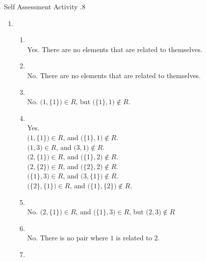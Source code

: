 \documentclass[../notes.tex]{subfiles}
\begin{document}
				\begin{exercise}{Self Assessment Activity \thechapter.8}
					\begin{enumerate}
						\item {}
							\begin{enumerate}[label=(\alph*)]
								\item {}\\
									Yes. There are no elements that are related to themselves.
								\item {}\\
									No. There are no elements that are related to themselves.
								\item {}\\
									No. $\bigl(1, \{1\}\bigr) \in R$, but $\bigl(\{1\}, 1\bigr) \notin R$.
								\item {}\\
									Yes.\\
									$\bigl(1, \{1\}\bigr) \in R$, and $\bigl(\{1\}, 1\bigr) \notin R$.\\
									$\bigl(1, 3\bigr) \in R$, and $\bigl(3, 1\bigr) \notin R$.\\
									$\bigl(2, \{1\}\bigr) \in R$, and $\bigl(\{1\}, 2\bigr) \notin R$.\\
									$\bigl(2, \{2\}\bigr) \in R$, and $\bigl(\{2\}, 2\bigr) \notin R$.\\
									$\bigl(\{1\}, 3\bigr) \in R$, and $\bigl(3, \{1\}\bigr) \notin R$.\\
									$\bigl(\{2\}, \{1\}\bigr) \in R$, and $\bigl(\{1\}, \{2\}\bigr) \notin R$.
								\item {}\\
									No. $\bigl(2, \{1\}\bigr) \in R$, and $\bigl(\{1\}, 3\bigr) \in R$, but $\bigl(2, 3\bigr) \notin R$
								\item {}\\
									No. There is no pair where $1$ is related to $2$.
								\item {}\\

\end{enumerate}
\end{enumerate}
\end{exercise}
\end{document}
